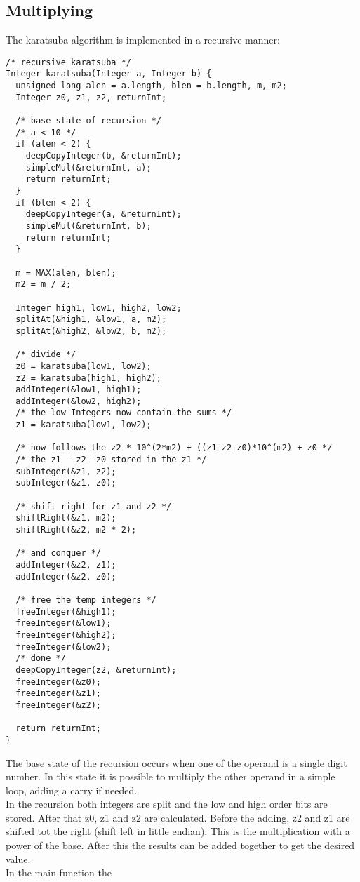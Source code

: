 \documentclass[a4paper,11pt]{article}
\begin{document}
\subsection{Multiplying}
The karatsuba algorithm is implemented in a recursive manner:
\begin{lstlisting}
/* recursive karatsuba */
Integer karatsuba(Integer a, Integer b) {
  unsigned long alen = a.length, blen = b.length, m, m2;
  Integer z0, z1, z2, returnInt;
  
  /* base state of recursion */
  /* a < 10 */
  if (alen < 2) {
    deepCopyInteger(b, &returnInt);
    simpleMul(&returnInt, a);
    return returnInt;
  }
  if (blen < 2) {
    deepCopyInteger(a, &returnInt);
    simpleMul(&returnInt, b);
    return returnInt;
  }
  
  m = MAX(alen, blen);
  m2 = m / 2;
  
  Integer high1, low1, high2, low2;
  splitAt(&high1, &low1, a, m2);
  splitAt(&high2, &low2, b, m2);
  
  /* divide */
  z0 = karatsuba(low1, low2);
  z2 = karatsuba(high1, high2);
  addInteger(&low1, high1);
  addInteger(&low2, high2);
  /* the low Integers now contain the sums */
  z1 = karatsuba(low1, low2);
  
  /* now follows the z2 * 10^(2*m2) + ((z1-z2-z0)*10^(m2) + z0 */
  /* the z1 - z2 -z0 stored in the z1 */
  subInteger(&z1, z2);
  subInteger(&z1, z0);
  
  /* shift right for z1 and z2 */
  shiftRight(&z1, m2);
  shiftRight(&z2, m2 * 2);
  
  /* and conquer */
  addInteger(&z2, z1);
  addInteger(&z2, z0);

  /* free the temp integers */
  freeInteger(&high1);
  freeInteger(&low1);
  freeInteger(&high2);
  freeInteger(&low2);
  /* done */
  deepCopyInteger(z2, &returnInt);
  freeInteger(&z0);
  freeInteger(&z1);
  freeInteger(&z2);
  
  return returnInt;
}
\end{lstlisting}
The base state of the recursion occurs when one of the operand is a single digit number.
In this state it is possible to multiply the other operand in a simple loop, adding a carry if needed.\\
In the recursion both integers are split and the low and high order bits are stored.
After that z0, z1 and z2 are calculated.
Before the adding, z2 and z1 are shifted tot the right (shift left in little endian).
This is the multiplication with a power of the base.
After this the results can be added together to get the desired value.\\
In the main function the 
\end{document}
